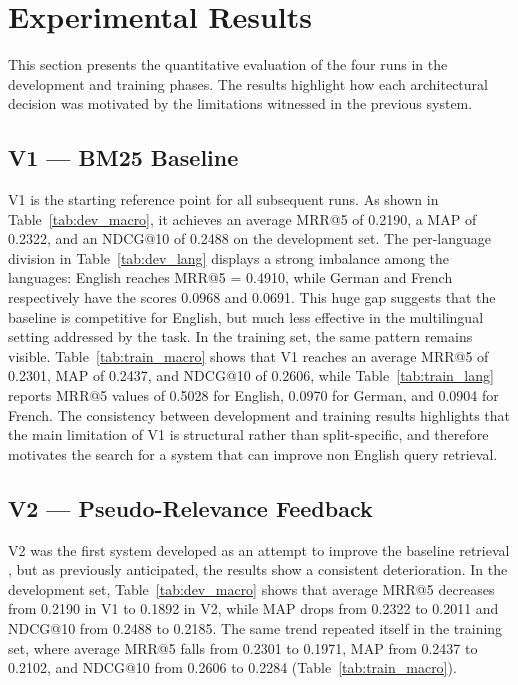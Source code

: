 \section{Experimental Results}
\label{sec:results}

This section presents the quantitative evaluation of the four runs in the development and training phases. The results highlight how each architectural decision was motivated by the limitations witnessed in the previous system.


\subsection{V1 — BM25 Baseline}

V1 is the starting reference point for all subsequent runs. As shown in 
Table~\ref{tab:dev_macro}, it achieves an average MRR@5 of 0.2190, a MAP of 0.2322, and an NDCG@10 of 0.2488 on the development set. The per-language division in Table~\ref{tab:dev_lang} displays a strong imbalance among the languages: English reaches MRR@5 = 0.4910, while German and French respectively have the scores 0.0968 and 0.0691. This huge gap suggests that the baseline is competitive for English, but much less effective in the multilingual setting addressed by the task. In the training set, the same pattern remains visible. Table~\ref{tab:train_macro} shows that V1 reaches an average MRR@5 of 0.2301, MAP of 0.2437, and NDCG@10 of 0.2606, while Table~\ref{tab:train_lang} reports MRR@5 values of 0.5028 for English, 0.0970 for German, and 0.0904 for French. The consistency between development and training results highlights that the main limitation of V1 is structural rather than split-specific, and therefore motivates the search for a system that can improve non English query retrieval.


\subsection{V2 — Pseudo-Relevance Feedback}

V2 was the first system developed as an attempt to improve the baseline retrieval , but as previously anticipated, the results show a consistent deterioration. In the development set, Table~\ref{tab:dev_macro} shows that average MRR@5 decreases from 0.2190 in V1 to 0.1892 in V2, while MAP drops from 0.2322 to 0.2011 and NDCG@10 from 0.2488 to 0.2185. The same trend repeated itself in the training set, where average MRR@5 falls from 0.2301 to 0.1971, MAP from 0.2437 to 0.2102, and NDCG@10 from 0.2606 to 0.2284 (Table~\ref{tab:train_macro}).

